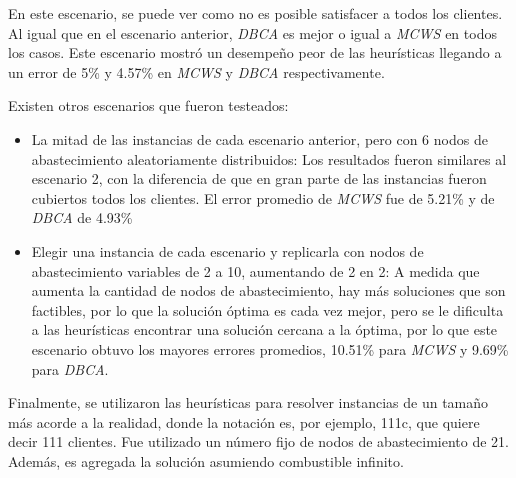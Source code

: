 \documentclass[letter, 10pt]{article}
\begin{document}
\begin{itemize}
\bigskip
En este escenario, se puede ver como no es posible satisfacer a todos los clientes. Al igual que en el escenario
anterior, \textit{DBCA} es mejor o igual a \textit{MCWS} en todos los casos. Este escenario mostró un desempeño
peor de las heurísticas llegando a un error de 5\% y 4.57\% en \textit{MCWS} y \textit{DBCA} respectivamente.

Existen otros escenarios que fueron testeados:
\begin{itemize}
\item La mitad de las instancias de cada escenario anterior, pero con 6 nodos de abastecimiento aleatoriamente
	distribuidos: Los resultados fueron similares al escenario 2, con la diferencia de que en gran parte de las
	instancias fueron cubiertos todos los clientes. El error promedio de \textit{MCWS} fue de 5.21\% y de 
	\textit{DBCA} de 4.93\%
\item Elegir una instancia de cada escenario y replicarla con nodos de abastecimiento variables de 2 a 10, aumentando
	de 2 en 2: A medida que aumenta la cantidad de nodos de abastecimiento, hay más soluciones que son factibles, por
	lo que la solución óptima es cada vez mejor, pero se le dificulta a las heurísticas encontrar una solución cercana
	a la óptima, por lo que este escenario obtuvo los mayores errores promedios, 10.51\% para \textit{MCWS} y
	9.69\% para \textit{DBCA}.
\end{itemize}

\newpage
Finalmente, se utilizaron las heurísticas para resolver instancias de un tamaño más acorde a la realidad, donde la notación es, por ejemplo, 111c, que quiere decir 111 clientes. Fue utilizado un número fijo de nodos de abastecimiento
de 21. Además, es agregada la solución asumiendo combustible infinito.


\end{itemize}
\end{document}

